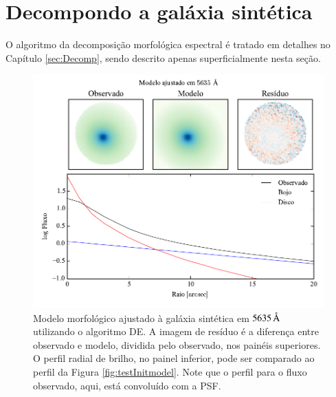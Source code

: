 
\section{Decompondo a galáxia sintética}

O algoritmo da decomposição morfológica espectral é tratado em detalhes no
Capítulo \ref{sec:Decomp}, sendo descrito apenas superficialmente nesta seção.


\begin{figure}
	\includegraphics{figuras/simulation_fitmodel}
	\caption[Modelo morfológico inicial do ajuste da galáxia sintética]
	{Modelo morfológico ajustado à galáxia sintética em $5635\,\text{\normalfont\AA}$
	utilizando o algoritmo DE. A imagem de resíduo é a diferença entre
	observado e modelo, dividida pelo observado, nos painéis superiores. O perfil
	radial de brilho, no painel inferior, pode ser comparado ao perfil da Figura
	\ref{fig:testInitmodel}. Note que o perfil para o fluxo observado, aqui, está
	convoluído com a PSF.}
	\label{fig:testFitmodel}
\end{figure}

